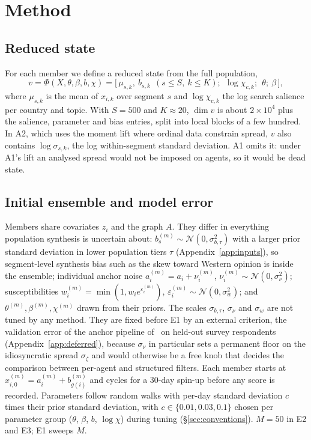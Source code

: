 \documentclass[10pt]{article}
\theoremstyle{remark}
\begin{document}
\section{Method}
\label{sec:method}

\subsection{Reduced state}
For each member we define a reduced state from the full population,
\begin{equation}
v = \Phi(X,\theta,\beta,b,\chi) = \big[\,\mu_{s,k},\ b_{s,k}\ \ (s\le S,\ k\le K);\ \ \log \chi_{c,k};\ \ \theta;\ \beta\,\big],
\end{equation}
where $\mu_{s,k}$ is the mean of $x_{i,k}$ over segment $s$ and $\log \chi_{c,k}$ the log search salience per country and topic. With $S=500$ and $K\approx20$, $\dim v$ is about $2\times10^4$ plus the salience, parameter and bias entries, split into local blocks of a few hundred. In A2, which uses the moment lift where ordinal data constrain spread, $v$ also contains $\log\sigma_{s,k}$, the log within-segment standard deviation. A1 omits it: under A1's lift an analysed spread would not be imposed on agents, so it would be dead state.

\subsection{Initial ensemble and model error}
\label{sec:init}
Members share covariates $z_i$ and the graph $A$. They differ in everything population synthesis is uncertain about: $b_s^{(m)}\sim\mathcal{N}(0,\sigma_{b,\tau}^2)$ with a larger prior standard deviation in lower population tiers $\tau$ (Appendix~\ref{app:inputs}), so segment-level synthesis bias such as the skew toward Western opinion is inside the ensemble; individual anchor noise $a_i^{(m)}=a_i+\nu_i^{(m)}$, $\nu_i^{(m)}\sim\mathcal{N}(0,\sigma_\nu^2)$; susceptibilities $w_i^{(m)}=\min(1,w_i e^{\varepsilon_i^{(m)}})$, $\varepsilon_i^{(m)}\sim\mathcal{N}(0,\sigma_{w}^2)$; and $\theta^{(m)},\beta^{(m)},\chi^{(m)}$ drawn from their priors. The scales $\sigma_{b,\tau}$, $\sigma_\nu$ and $\sigma_w$ are not tuned by any method. They are fixed before E1 by an external criterion, the validation error of the anchor pipeline of~\cite{rw_unequally} on held-out survey respondents (Appendix~\ref{app:deferred}), because $\sigma_\nu$ in particular sets a permanent floor on the idiosyncratic spread $\sigma_\zeta$ and would otherwise be a free knob that decides the comparison between per-agent and structured filters. Each member starts at $x_{i,0}^{(m)}=a_i^{(m)}+b^{(m)}_{g(i)}$ and cycles for a 30-day spin-up before any score is recorded. Parameters follow random walks with per-day standard deviation $c$ times their prior standard deviation, with $c\in\{0.01,0.03,0.1\}$ chosen per parameter group ($\theta$, $\beta$, $b$, $\log\chi$) during tuning (\S\ref{sec:conventions}). $M=50$ in E2 and E3; E1 sweeps $M$.
\end{document}

